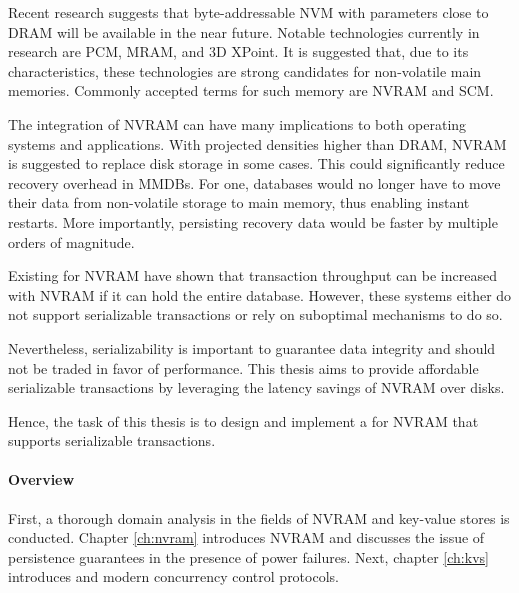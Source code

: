 Recent research suggests that byte-addressable \ac{NVM} with parameters close to
\ac{DRAM} will be available in the near future. Notable technologies currently
in research are \ac{PCM}, \ac{MRAM}, and 3D XPoint. It is suggested that, due to
its characteristics, these technologies are strong candidates for non-volatile
main memories. Commonly accepted terms for such memory are \ac{NVRAM} and
\ac{SCM}.



The integration of \ac{NVRAM} can have many implications to both operating
systems and applications. With projected densities higher than \ac{DRAM},
\ac{NVRAM} is suggested to replace disk storage in some cases. This could
significantly reduce recovery overhead in \acp{MMDB}. For one, databases would
no longer have to move their data from non-volatile storage to main memory, thus
enabling instant restarts. More importantly, persisting recovery data would be
faster by multiple orders of magnitude.

Existing \kvsp for \ac{NVRAM} have shown that transaction throughput can be
increased with \ac{NVRAM} if it can hold the entire database. However, these
systems either do not support serializable transactions or rely on suboptimal
mechanisms to do so.

Nevertheless, serializability is important to guarantee data integrity and
should not be traded in favor of performance. This thesis aims to provide
affordable serializable transactions by leveraging the latency savings of
\ac{NVRAM} over disks.


Hence, the task of this thesis is to design and implement a \kvs for \ac{NVRAM}
that supports serializable transactions.


\paragraph{Overview}

First, a thorough domain analysis in the fields of \ac{NVRAM} and key-value
stores is conducted. Chapter \ref{ch:nvram} introduces \ac{NVRAM} and discusses
the issue of persistence guarantees in the presence of power failures. Next,
chapter \ref{ch:kvs} introduces \kvsp and modern concurrency control protocols.

